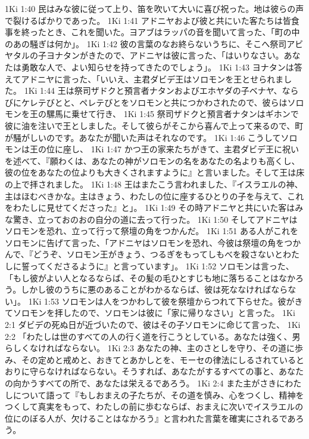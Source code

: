 1Ki 1:40  民はみな彼に従って上り、笛を吹いて大いに喜び祝った。地は彼らの声で裂けるばかりであった。
1Ki 1:41  アドニヤおよび彼と共にいた客たちは皆食事を終ったとき、これを聞いた。ヨアブはラッパの音を聞いて言った、「町の中のあの騒ぎは何か」。
1Ki 1:42  彼の言葉のなお終らないうちに、そこへ祭司アビヤタルの子ヨナタンがきたので、アドニヤは彼に言った、「はいりなさい。あなたは勇敢な人で、よい知らせを持ってきたのでしょう」。
1Ki 1:43  ヨナタンは答えてアドニヤに言った、「いいえ、主君ダビデ王はソロモンを王とせられました。
1Ki 1:44  王は祭司ザドクと預言者ナタンおよびエホヤダの子ベナヤ、ならびにケレテびとと、ペレテびとをソロモンと共につかわされたので、彼らはソロモンを王の騾馬に乗せて行き、
1Ki 1:45  祭司ザドクと預言者ナタンはギホンで彼に油を注いで王としました。そして彼らがそこから喜んで上って来るので、町が騒がしいのです。あなたが聞いた声はそれなのです。
1Ki 1:46  こうしてソロモンは王の位に座し、
1Ki 1:47  かつ王の家来たちがきて、主君ダビデ王に祝いを述べて、『願わくは、あなたの神がソロモンの名をあなたの名よりも高くし、彼の位をあなたの位よりも大きくされますように』と言いました。そして王は床の上で拝されました。
1Ki 1:48  王はまたこう言われました、『イスラエルの神、主はほむべきかな。主はきょう、わたしの位に座するひとりの子を与えて、これをわたしに見せてくださった』と」。
1Ki 1:49  その時アドニヤと共にいた客はみな驚き、立っておのおの自分の道に去って行った。
1Ki 1:50  そしてアドニヤはソロモンを恐れ、立って行って祭壇の角をつかんだ。
1Ki 1:51  ある人がこれをソロモンに告げて言った、「アドニヤはソロモンを恐れ、今彼は祭壇の角をつかんで、『どうぞ、ソロモン王がきょう、つるぎをもってしもべを殺さないとわたしに誓ってくださるように』と言っています」。
1Ki 1:52  ソロモンは言った、「もし彼がよい人となるならば、その髪の毛ひとすじも地に落ちることはなかろう。しかし彼のうちに悪のあることがわかるならば、彼は死ななければならない」。
1Ki 1:53  ソロモンは人をつかわして彼を祭壇からつれて下らせた。彼がきてソロモンを拝したので、ソロモンは彼に「家に帰りなさい」と言った。
1Ki 2:1  ダビデの死ぬ日が近づいたので、彼はその子ソロモンに命じて言った、
1Ki 2:2  「わたしは世のすべての人の行く道を行こうとしている。あなたは強く、男らしくなければならない。
1Ki 2:3  あなたの神、主のさとしを守り、その道に歩み、その定めと戒めと、おきてとあかしとを、モーセの律法にしるされているとおりに守らなければならない。そうすれば、あなたがするすべての事と、あなたの向かうすべての所で、あなたは栄えるであろう。
1Ki 2:4  また主がさきにわたしについて語って『もしおまえの子たちが、その道を慎み、心をつくし、精神をつくして真実をもって、わたしの前に歩むならば、おまえに次いでイスラエルの位にのぼる人が、欠けることはなかろう』と言われた言葉を確実にされるであろう。
